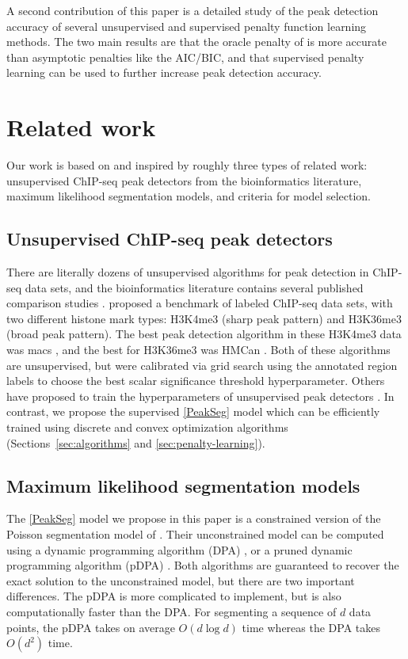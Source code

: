 \documentclass{article}
\begin{document}
A second contribution of this paper is a detailed study of the peak
detection accuracy of several unsupervised and supervised penalty
function learning methods. The two main results are that the oracle
penalty of \citet{cleynen2013segmentation} is more accurate than
asymptotic penalties like the AIC/BIC, and that supervised penalty
learning can be used to further increase peak detection accuracy.

\section{Related work}
\label{sec:related}

Our work is based on and inspired by roughly three types of related
work:
unsupervised ChIP-seq peak detectors from the bioinformatics
literature, maximum likelihood segmentation models, 
and criteria for model selection.

\subsection{Unsupervised ChIP-seq peak detectors}

There are literally dozens of unsupervised algorithms for peak
detection in ChIP-seq data sets, and the bioinformatics literature
contains several published comparison studies \citep{evaluation2010,
  rye2010manually, chip-seq-bench}. \citet{hocking2014visual} proposed
a benchmark of labeled ChIP-seq data sets, with two different histone
mark types: H3K4me3 (sharp peak pattern) and H3K36me3 (broad peak
pattern). The best peak detection algorithm in these H3K4me3 data was
macs \citep{MACS}, and the best for H3K36me3 was HMCan
\citep{HMCan}. Both of these algorithms are unsupervised, but were
calibrated via grid search using the annotated region labels to choose
the best scalar significance threshold hyperparameter.  Others have
proposed to train the hyperparameters of unsupervised peak detectors
\citep{picking2012, DFilter}. In contrast, we propose the supervised
\ref{PeakSeg} model which can be efficiently trained using discrete
and convex optimization algorithms (Sections~\ref{sec:algorithms} and
\ref{sec:penalty-learning}).

\subsection{Maximum likelihood segmentation models}

The \ref{PeakSeg} model we propose in this paper is a constrained
version of the Poisson segmentation model of \citet{Segmentor}.
Their unconstrained model can be computed using a dynamic programming
algorithm (DPA) \citep{bellman}, or a pruned dynamic programming
algorithm (pDPA) \citep{pruned-dp}. Both algorithms are guaranteed to
recover the exact solution to the unconstrained model, but there are
two important differences. The pDPA is more complicated to implement,
but is also computationally faster than the DPA. For segmenting a
sequence of $d$ data points, the pDPA takes on average $O(d\log d)$
time whereas the DPA takes $O(d^2)$ time. 
\end{document}
